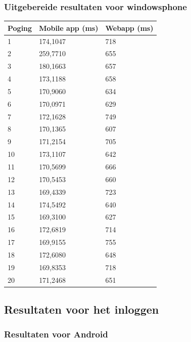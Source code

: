 \documentclass[pdftex,a4paper,12pt,twoside]{report}
\begin{document}
\subsubsection{Uitgebereide resultaten voor windowsphone}
\begin{center}
    \begin{tabular}{ | l | l | l |}
    \hline
    Poging & Mobile app (ms) & Webapp (ms)
      \\ \hline
      1 & 174,1047 & 718
      \\ \hline
      2 & 259,7710 & 655
      \\ \hline
      3 & 180,1663 & 657
      \\ \hline
      4 & 173,1188 & 658
      \\ \hline
      5 & 170,9060 & 634
      \\ \hline
      6 & 170,0971 & 629
      \\ \hline
      7 & 172,1628 & 749
      \\ \hline
      8 & 170,1365 & 607
      \\ \hline
      9 & 171,2154 & 705
      \\ \hline
      10 & 173,1107 & 642
      \\ \hline
      11 & 170,5699 & 666
      \\ \hline
      12 & 170,5453 & 660
      \\ \hline
      13 & 169,4339 & 723
      \\ \hline
      14 & 174,5492 & 640
      \\ \hline
      15 & 169,3100 & 627
      \\ \hline
      16 & 172,6819 & 714
      \\ \hline
      17 & 169,9155 & 755
      \\ \hline
      18 & 172,6080 & 648
      \\ \hline
      19 & 169,8353 & 718
      \\ \hline
      20 & 171,2468 & 651
      \\ \hline
    \end{tabular}
\end{center}
\subsection{Resultaten voor het inloggen}
\subsubsection{Resultaten voor Android}
\end{document}
